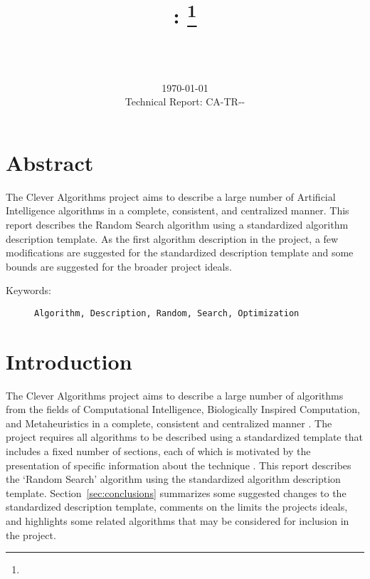 \documentclass[a4paper, 11pt]{article}
\title{{\myreporttitle}: {\myreportsubtitle}\footnote{\myreportlicense}}
\author{\myreportauthor\\{\myreportemail}\\\small\myreportproject}
\date{\today\\{\small{Technical Report: CA-TR-{\myreportdate}-\myreportversion}}}
\begin{document}
\maketitle

\section*{Abstract} 
The Clever Algorithms project aims to describe a large number of Artificial Intelligence algorithms in a complete, consistent, and centralized manner.
This report describes the Random Search algorithm using a standardized algorithm description template.
As the first algorithm description in the project, a few modifications are suggested for the standardized description template and some bounds are suggested for the broader project ideals.

\begin{description}
	\item[Keywords:] {\small\texttt{Algorithm, Description, Random, Search, Optimization}}
\end{description} 

\section{Introduction} 
\label{sec:intro}
The Clever Algorithms project aims to describe a large number of algorithms from the fields of Computational Intelligence, Biologically Inspired Computation, and Metaheuristics in a complete, consistent and centralized manner \cite{Brownlee2010}.
The project requires all algorithms to be described using a standardized template that includes a fixed number of sections, each of which is motivated by the presentation of specific information about the technique \cite{Brownlee2010a}.
This report describes the `Random Search' algorithm using the standardized algorithm description template. 
Section~\ref{sec:conclusions} summarizes some suggested changes to the standardized description template, comments on the limits the projects ideals, and highlights some related algorithms that may be considered for inclusion in the project.

\end{document}
